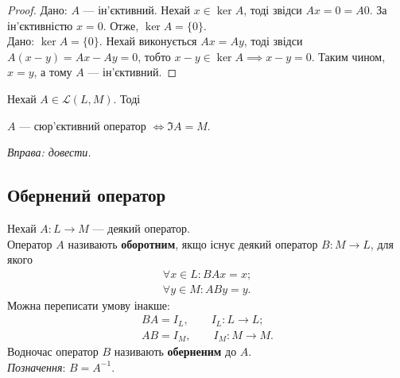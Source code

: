\documentclass{math_library}
\begin{document}
	\begin{proof}
	\rightproof Дано: $A$ --- ін'єктивний. Нехай $x \in \ker A$, тоді звідси $Ax = 0 = A0$. За ін'єктивністю $x = 0$. Отже, $\ker A = \{0\}$.
	\bigskip \\
	\leftproof Дано: $\ker A = \{0\}$. Нехай виконується $Ax = Ay$, тоді звідси $A(x-y) = Ax - Ay = 0$, тобто $x-y \in \ker A \implies x - y = 0$. Таким чином, $x = y$, а тому $A$ --- ін'єктивний.
	\end{proof}
	
	\begin{proposition}
	\label{onto_criterion}
	Нехай $A \in \mathcal{L}(L,M)$. Тоді
	\begin{center}
	$A$ --- сюр'єктивний оператор $\iff \Im A = M$.
	\end{center}
	\textit{Вправа: довести.}
	\end{proposition}

	\subsection{Обернений оператор}
	\begin{definition}
	Нехай $A \colon L \to M$ --- деякий оператор.\\
	Оператор $A$ називають \textbf{оборотним}, якщо існує деякий оператор $B \colon M \to L$, для якого
	\begin{align*}
	\forall x \in L: BAx = x; \\
	\forall y \in M: ABy = y.
	\end{align*}
	Можна переписати умову інакше:
	\begin{align*}
	BA = I_L, \qquad I_L \colon L \to L; \\
	AB = I_M, \qquad I_M \colon M \to M.
	\end{align*}
	Водночас оператор $B$ називають \textbf{оберненим} до $A$.\\
	\textit{Позначення}: $B = A^{-1}$.
	\end{definition}
	
\end{document}
